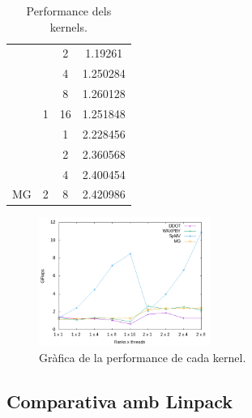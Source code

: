 \begin{table}[]
\begin{tabular}{cccc}
                         & \cellcolor[HTML]{EFEFEF}                    & \cellcolor[HTML]{EFEFEF}2  & \cellcolor[HTML]{EFEFEF}1.19261   \\
                         & \cellcolor[HTML]{EFEFEF}                    & 4                          & 1.250284                          \\
                         & \cellcolor[HTML]{EFEFEF}                    & \cellcolor[HTML]{EFEFEF}8  & \cellcolor[HTML]{EFEFEF}1.260128  \\
                         & \multirow{-5}{*}{\cellcolor[HTML]{EFEFEF}1} & 16                         & 1.251848                          \\ \cline{3-4} 
                         &                                             & 1                          & 2.228456                          \\
                         &                                             & \cellcolor[HTML]{EFEFEF}2  & \cellcolor[HTML]{EFEFEF}2.360568  \\
                         &                                             & 4                          & 2.400454                          \\
\multirow{-9}{*}{MG}     & \multirow{-4}{*}{2}                         & \cellcolor[HTML]{EFEFEF}8  & \cellcolor[HTML]{EFEFEF}2.420986  \\ \hline
    \end{tabular}
    \caption{Performance dels kernels.}
    \label{tab:hpcg_kernel_perf}
\end{table}


\begin{figure}
    \centering
    \includegraphics[width=0.5\textwidth]{img/hpcg_kernels_grafica.png}
    \caption{Gràfica de la performance de cada kernel.}
    \label{fig:hpcg_kernel_perf}
\end{figure}

\subsection{Comparativa amb Linpack}
